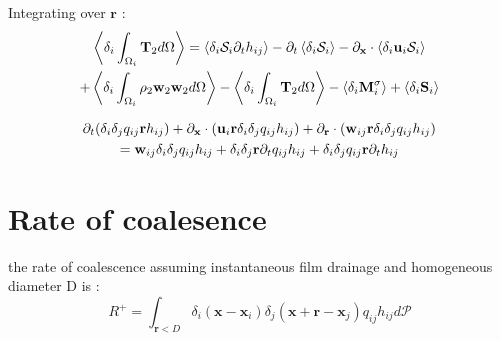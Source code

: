 Integrating over $\textbf{r}$ : 
\begin{multline*}
    \left<\delta_i \int_{\Omega_i}\mathbf{T}_2d\Omega\right>
    =
    \left<\delta_i\mathcal{S}_{i}\partial_t h_{ij}\right>
    - \partial_t \left<\delta_i \mathcal{S}_i\right>
    - \partial_\textbf{x} \cdot \left<\delta_i  \textbf{u}_i \mathcal{S}_i\right>\\
    + \left<\delta_i\int_{\Omega_i} \rho_2 \textbf{w}_2 \textbf{w}_2d\Omega\right>
    - \left<\delta_i\int_{\Omega_i}\mathbf{T}_2d\Omega\right>
    - \left<\delta_i\textbf{M}_i^\sigma\right>
    + \left<\delta_i\textbf{S}_i\right>
\end{multline*}

\begin{multline*}
    \partial_t (\delta_i\delta_{j}q_{ij}\textbf{r}h_{ij}) 
  + \partial_\textbf{x} \cdot (\textbf{u}_i \textbf{r}\delta_i\delta_{j}q_{ij}h_{ij})
  + \partial_\textbf{r} \cdot (\textbf{w}_{ij} \textbf{r}\delta_i\delta_{j}q_{ij}h_{ij}) \\
  =  \textbf{w}_{ij} \delta_i\delta_{j}q_{ij}h_{ij}
  + \delta_i\delta_{j}\textbf{r}\partial_t q_{ij}h_{ij} 
  + \delta_i\delta_{j}q_{ij}\textbf{r}\partial_t h_{ij} 
\end{multline*}

\section*{Rate of coalesence }

the rate of coalescence assuming instantaneous film drainage and homogeneous diameter D is :
\begin{equation*}
    R^+ 
    = \int_{\textbf{r}<D}\delta_i(\textbf{x} - \textbf{x}_i)\delta_{j}(\textbf{x} + \textbf{r} - \textbf{x}_j) q_{ij} h_{ij} d\mathscr{P}  
\end{equation*} 




